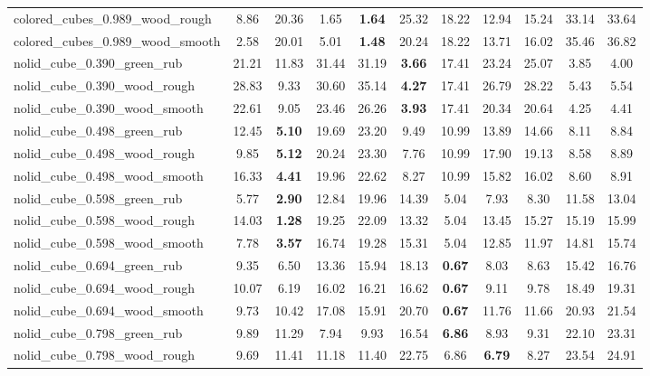 \begin{table}[H]
{\begin{tabular}{l cccccccccc}
        colored\_cubes\_0.989\_wood\_rough & 8.86 & 20.36 & 1.65 & \textbf{1.64} & 25.32 & 18.22 & 12.94 & 15.24 & 33.14 & 33.64 \\
        colored\_cubes\_0.989\_wood\_smooth & 2.58 & 20.01 & 5.01 & \textbf{1.48} & 20.24 & 18.22 & 13.71 & 16.02 & 35.46 & 36.82 \\
        nolid\_cube\_0.390\_green\_rub & 21.21 & 11.83 & 31.44 & 31.19 & \textbf{3.66} & 17.41 & 23.24 & 25.07 & 3.85 & 4.00 \\
        nolid\_cube\_0.390\_wood\_rough & 28.83 & 9.33 & 30.60 & 35.14 & \textbf{4.27} & 17.41 & 26.79 & 28.22 & 5.43 & 5.54 \\
        nolid\_cube\_0.390\_wood\_smooth & 22.61 & 9.05 & 23.46 & 26.26 & \textbf{3.93} & 17.41 & 20.34 & 20.64 & 4.25 & 4.41 \\
        nolid\_cube\_0.498\_green\_rub & 12.45 & \textbf{5.10} & 19.69 & 23.20 & 9.49 & 10.99 & 13.89 & 14.66 & 8.11 & 8.84 \\
        nolid\_cube\_0.498\_wood\_rough & 9.85 & \textbf{5.12} & 20.24 & 23.30 & 7.76 & 10.99 & 17.90 & 19.13 & 8.58 & 8.89 \\
        nolid\_cube\_0.498\_wood\_smooth & 16.33 & \textbf{4.41} & 19.96 & 22.62 & 8.27 & 10.99 & 15.82 & 16.02 & 8.60 & 8.91 \\
        nolid\_cube\_0.598\_green\_rub & 5.77 & \textbf{2.90} & 12.84 & 19.96 & 14.39 & 5.04 & 7.93 & 8.30 & 11.58 & 13.04 \\
        nolid\_cube\_0.598\_wood\_rough & 14.03 & \textbf{1.28} & 19.25 & 22.09 & 13.32 & 5.04 & 13.45 & 15.27 & 15.19 & 15.99 \\
        nolid\_cube\_0.598\_wood\_smooth & 7.78 & \textbf{3.57} & 16.74 & 19.28 & 15.31 & 5.04 & 12.85 & 11.97 & 14.81 & 15.74 \\
        nolid\_cube\_0.694\_green\_rub & 9.35 & 6.50 & 13.36 & 15.94 & 18.13 & \textbf{0.67} & 8.03 & 8.63 & 15.42 & 16.76 \\
        nolid\_cube\_0.694\_wood\_rough & 10.07 & 6.19 & 16.02 & 16.21 & 16.62 & \textbf{0.67} & 9.11 & 9.78 & 18.49 & 19.31 \\
        nolid\_cube\_0.694\_wood\_smooth & 9.73 & 10.42 & 17.08 & 15.91 & 20.70 & \textbf{0.67} & 11.76 & 11.66 & 20.93 & 21.54 \\
        nolid\_cube\_0.798\_green\_rub & 9.89 & 11.29 & 7.94 & 9.93 & 16.54 & \textbf{6.86} & 8.93 & 9.31 & 22.10 & 23.31 \\
        nolid\_cube\_0.798\_wood\_rough & 9.69 & 11.41 & 11.18 & 11.40 & 22.75 & 6.86 & \textbf{6.79} & 8.27 & 23.54 & 24.91 \\

\end{tabular}}
\end{table}
